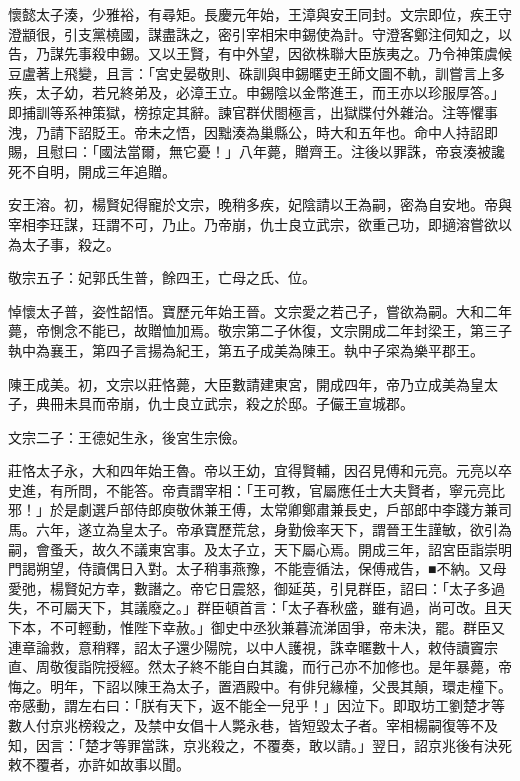 \begin{pinyinscope}
 懷懿太子湊，少雅裕，有尋矩。長慶元年始，王漳與安王同封。文宗即位，疾王守澄顓很，引支黨橈國，謀盡誅之，密引宰相宋申錫使為計。守澄客鄭注伺知之，以告，乃謀先事殺申錫。又以王賢，有中外望，因欲株聯大臣族夷之。乃令神策虞候豆盧著上飛變，且言：「宮史晏敬則、硃訓與申錫暱吏王師文圖不軌，訓嘗言上多疾，太子幼，若兄終弟及，必漳王立。申錫陰以金幣進王，而王亦以珍服厚答。」即捕訓等系神策獄，榜掠定其辭。諫官群伏閤極言，出獄牒付外雜治。注等懼事洩，乃請下詔貶王。帝未之悟，因黜湊為巢縣公，時大和五年也。命中人持詔即賜，且慰曰：「國法當爾，無它憂！」八年薨，贈齊王。注後以罪誅，帝哀湊被讒死不自明，開成三年追贈。



 安王溶。初，楊賢妃得寵於文宗，晚稍多疾，妃陰請以王為嗣，密為自安地。帝與宰相李玨謀，玨謂不可，乃止。乃帝崩，仇士良立武宗，欲重己功，即擿溶嘗欲以為太子事，殺之。



 敬宗五子：妃郭氏生普，餘四王，亡母之氏、位。



 悼懷太子普，姿性韶悟。寶歷元年始王晉。文宗愛之若己子，嘗欲為嗣。大和二年薨，帝惻念不能已，故贈恤加焉。敬宗第二子休復，文宗開成二年封梁王，第三子執中為襄王，第四子言揚為紀王，第五子成美為陳王。執中子寀為樂平郡王。



 陳王成美。初，文宗以莊恪薨，大臣數請建東宮，開成四年，帝乃立成美為皇太子，典冊未具而帝崩，仇士良立武宗，殺之於邸。子儼王宣城郡。



 文宗二子：王德妃生永，後宮生宗儉。



 莊恪太子永，大和四年始王魯。帝以王幼，宜得賢輔，因召見傅和元亮。元亮以卒史進，有所問，不能答。帝責謂宰相：「王可教，官屬應任士大夫賢者，寧元亮比邪！」於是劇選戶部侍郎庾敬休兼王傅，太常卿鄭肅兼長史，戶部郎中李踐方兼司馬。六年，遂立為皇太子。帝承寶歷荒怠，身勤儉率天下，謂晉王生謹敏，欲引為嗣，會蚤夭，故久不議東宮事。及太子立，天下屬心焉。開成三年，詔宮臣詣崇明門謁朔望，侍讀偶日入對。太子稍事燕豫，不能壹循法，保傅戒告，■不納。又母愛弛，楊賢妃方幸，數譖之。帝它日震怒，御延英，引見群臣，詔曰：「太子多過失，不可屬天下，其議廢之。」群臣頓首言：「太子春秋盛，雖有過，尚可改。且天下本，不可輕動，惟陛下幸赦。」御史中丞狄兼暮流涕固爭，帝未決，罷。群臣又連章論救，意稍釋，詔太子還少陽院，以中人護視，誅幸暱數十人，敕侍讀竇宗直、周敬復詣院授經。然太子終不能自白其讒，而行己亦不加修也。是年暴薨，帝悔之。明年，下詔以陳王為太子，置酒殿中。有俳兒緣橦，父畏其顛，環走橦下。帝感動，謂左右曰：「朕有天下，返不能全一兒乎！」因泣下。即取坊工劉楚才等數人付京兆榜殺之，及禁中女倡十人斃永巷，皆短毀太子者。宰相楊嗣復等不及知，因言：「楚才等罪當誅，京兆殺之，不覆奏，敢以請。」翌日，詔京兆後有決死敕不覆者，亦許如故事以聞。




\end{pinyinscope}
